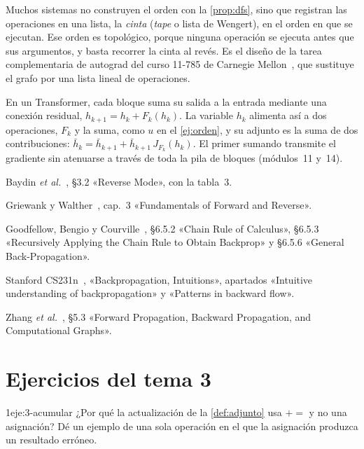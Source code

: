 \begin{observacion}[La cinta]\label{obs:cinta}
Muchos sistemas no construyen el orden con la \cref{prop:dfs}, sino que registran las operaciones en una lista, la \emph{cinta} (\emph{tape} o lista de Wengert), en el orden en que se ejecutan. Ese orden es topológico, porque ninguna operación se ejecuta antes que sus argumentos, y basta recorrer la cinta al revés. Es el diseño de la tarea complementaria de autograd del curso 11-785 de Carnegie Mellon~\cite[§2.3]{cmu11785}, que sustituye el grafo por una lista lineal de operaciones.
\end{observacion}

\begin{observacion}
En un Transformer, cada bloque suma su salida a la entrada mediante una conexión residual, $h_{k+1}=h_k+F_k(h_k)$. La variable $h_k$ alimenta así a dos operaciones, $F_k$ y la suma, como $u$ en el \cref{ej:orden}, y su adjunto es la suma de dos contribuciones: $\bar h_k=\bar h_{k+1}+\bar h_{k+1}\,J_{F_k}(h_k)$. El primer sumando transmite el gradiente sin atenuarse a través de toda la pila de bloques (módulos~11 y~14).
\end{observacion}

\begin{lecturas}
\item Baydin \emph{et al.}~\cite{baydin}, §3.2 «Reverse Mode», con la tabla~3.
\item Griewank y Walther~\cite{gw}, cap.~3 «Fundamentals of Forward and Reverse».
\item Goodfellow, Bengio y Courville~\cite{gbc}, §6.5.2 «Chain Rule of Calculus», §6.5.3 «Recursively Applying the Chain Rule to Obtain Backprop» y §6.5.6 «General Back-Propagation».
\item Stanford CS231n~\cite{cs231n}, «Backpropagation, Intuitions», apartados «Intuitive understanding of backpropagation» y «Patterns in backward flow».
\item Zhang \emph{et al.}~\cite{d2l}, §5.3 «Forward Propagation, Backward Propagation, and Computational Graphs».
\end{lecturas}

\section*{Ejercicios del tema 3}

\begin{ejercicio}{1}{eje:3-acumular}
¿Por qué la actualización de la \cref{def:adjunto} usa $\mathrel{+}=$ y no una asignación? Dé un ejemplo de una sola operación en el que la asignación produzca un resultado erróneo.
\end{ejercicio}

